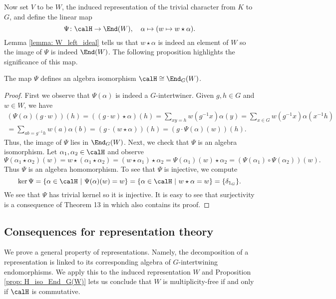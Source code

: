Now set $V$ to be $W$, the induced representation of the trivial character from $K$ to $G$, and define the linear map
\[
    \Psi\colon \calH\to\End(W),\quad \alpha\mapsto(w\mapsto w\star\alpha).
\]
Lemma \ref{lemma: W_left_ideal} tells us that $w \star\alpha$ is indeed an element of $W$ so the image of $\Psi$ is indeed $\End(W)$.
The following proposition highlights the significance of this map.
\begin{prop}\label{prop: H_iso_End_G(W)}
    The map $\Psi$ defines an algebra isomorphism $\calH \cong \End_G(W)$.
\end{prop}
\begin{proof}
    First we observe that $\Psi(\alpha)$ is indeed a $G$-intertwiner.
    Given $g,h\in G$ and $w\in W$, we have
    \begin{multline*}
        (\Psi(\alpha)(g\cdot w))(h) = ((g\cdot w)\star\alpha)(h) = \sum_{xy=h} w(g^{-1}x)\alpha(y) = \sum_{x\in G} w(g^{-1}x)\alpha(x^{-1}h) \\
        = \sum_{ab=g^{-1}h} w(a)\alpha(b) = (g\cdot(w\star\alpha))(h) = (g\cdot \Psi(\alpha)(w))(h).
    \end{multline*}
    Thus, the image of $\Psi$ lies in $\End_G(W)$.
    Next, we check that $\Psi$ is an algebra isomorphism.
    Let $\alpha_1,\alpha_2\in\calH$ and observe
    \[
        \Psi(\alpha_1\star\alpha_2)(w) = w\star(\alpha_1\star\alpha_2) = (w\star\alpha_1)\star\alpha_2 = \Psi(\alpha_1)(w)\star\alpha_2 = (\Psi(\alpha_1)\circ\Psi(\alpha_2))(w).
    \]
    Thus $\Psi$ is an algebra homomorphism.
    To see that $\Psi$ is injective, we compute
    \[
        \ker \Psi = \{\alpha\in\calH\ |\ \Psi(\alpha)(w) = w\} = \{\alpha\in\calH\ |\ w\star\alpha = w\} = \{\delta_{1_G}\}.
    \]
    We see that $\Psi$ has trivial kernel so it is injective.
    It is easy to see that surjectivity is a consequence of Theorem 13 in \cite{Murnaghan05} which also contains its proof.
\end{proof}


\subsection{Consequences for representation theory}\label{Section1.6}
We prove a general property of representations.
Namely, the decomposition of a representation is linked to its corresponding algebra of $G$-intertwining endomorphisms.
We apply this to the induced representation $W$ and Proposition \ref{prop: H_iso_End_G(W)} lets us conclude that $W$ is multiplicity-free if and only if $\calH$ is commutative.

